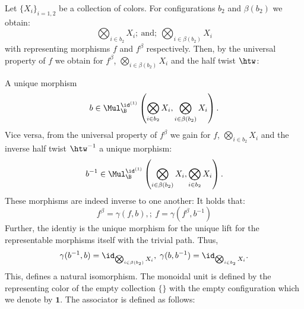 \begin{const}
    Let $\{X_i\}_{i=1,2}$ be a collection of colors. For configurations $b_2$
    and $\beta(b_2)$ we obtain:
    \[
        \bigotimes_{i \in b_2} X_i ;\ \text{and} ;\ \bigotimes_{i \in \beta(b_2)} X_i
    \]
    with representing morphisms $f$ and $f^{\beta}$ respectively. Then, by the
    universal property of $f$ we obtain for $f^{\beta}$, $\bigotimes_{i \in
    \beta(b_2)} X_i$ and the half twist $\htw$:
    \begin{center}
    \end{center}
    A unique morphism
    \[
        b \in \Mul^{\id^{(1)}}_{\B}\left(\bigotimes_{i \in b_2} X_i, \bigotimes_{i \in \beta(b_2)} X_i \right).
    \]
    Vice versa, from the universal property of $f^{\beta}$ we gain for $f$,
    $\bigotimes_{i \in b_2} X_i$ and the inverse half twist $\htw^{-1}$ a unique
    morphism:
    \[
        b^{-1} \in \Mul^{\id^{(1)}}_{\B}\left(\bigotimes_{i \in \beta(b_2)} X_i, \bigotimes_{i \in b_2} X_i \right).
    \]
    These morphisms are indeed inverse to one another: It holds that:
    \[
        f^{\beta} = \gamma(f, b), ;\ f=\gamma(f^{\beta}, b^{-1})
    \]
    Further, the identiy is the unique morphism for the unique lift for the
    representable morphisms itself with the trivial path. Thus,
    \[
        \gamma(b^{-1}, b) = \id_{\bigotimes_{i \in \beta(b_2)}X_i},  \; \gamma(b, b^{-1}) = \id_{\bigotimes_{i \in b_2}X_i}.
    \]
    This, defines a natural isomorphism. The monoidal unit is defined by the
    representing color of the empty collection $\{\}$ with the empty
    configuration which we denote by $\mathbf{1}$. The associator is defined as
    follows:
\end{const}

